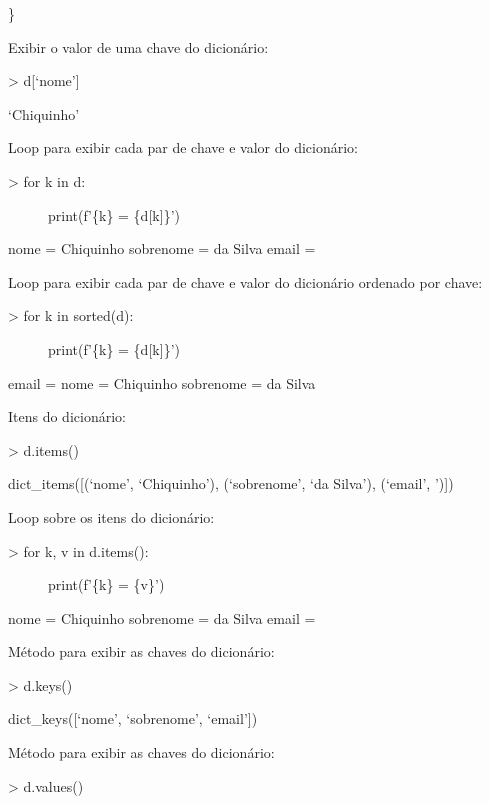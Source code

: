 \documentclass[letterpaper,10pt,brazil]{sphinxmanual}
\begin{document}
\}

Exibir o valor de uma chave do dicionário:

\textgreater{} d{[}‘nome’{]}

‘Chiquinho’

Loop para exibir cada par de chave e valor do dicionário:
\begin{description}
\item[{\textgreater{} for k in d:}] \leavevmode
print(f’\{k\} = \{d{[}k{]}\}’)

\end{description}

nome = Chiquinho
sobrenome = da Silva
email = 

Loop para exibir cada par de chave e valor do dicionário ordenado por chave:
\begin{description}
\item[{\textgreater{} for k in sorted(d):}] \leavevmode
print(f’\{k\} = \{d{[}k{]}\}’)

\end{description}

email = 
nome = Chiquinho
sobrenome = da Silva

Itens do dicionário:

\textgreater{} d.items()

dict\_items({[}(‘nome’, ‘Chiquinho’), (‘sobrenome’, ‘da Silva’), (‘email’, ’){]})

Loop sobre os itens do dicionário:
\begin{description}
\item[{\textgreater{} for k, v in d.items():}] \leavevmode
print(f’\{k\} = \{v\}’)

\end{description}

nome = Chiquinho
sobrenome = da Silva
email = 

Método para exibir as chaves do dicionário:

\textgreater{} d.keys()

dict\_keys({[}‘nome’, ‘sobrenome’, ‘email’{]})

Método para exibir as chaves do dicionário:

\textgreater{} d.values()
\end{document}
